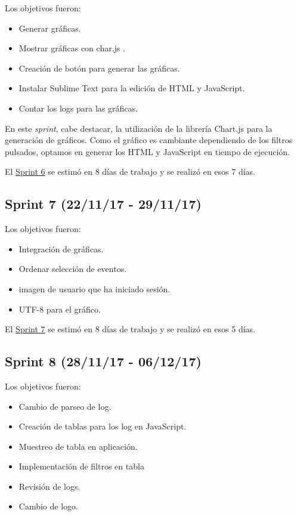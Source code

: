 Los objetivos fueron:
\begin{itemize}
	\tightlist
	\item
	Generar gráficas.
	\item
	Mostrar gráficas con char.js \cite{javascript:chart}.
	\item
	Creación de botón para generar las gráficas.	
	\item
	Instalar Sublime Text para la edición de HTML y JavaScript.
	\item
	Contar los logs para las gráficas.
	
\end{itemize}

En este \emph{sprint}, cabe destacar, la utilización de la librería Chart.js para la generación de gráficos. Como el gráfico es cambiante dependiendo de los filtros pulsados, optamos en generar los HTML y JavaScript en tiempo de ejecución.

El \href{https://github.com/trona85/GII-17.1B-UBULog-1.0/milestone/6?closed=1}{Sprint 6} se estimó en 8 días de trabajo y se realizó en esos 7 días.

\newpage
\subsection{Sprint 7 (22/11/17 -
	29/11/17)}\label{sprint-7-221117---291117}

Los objetivos fueron:
\begin{itemize}
	\tightlist
	\item
	Integración de gráficas.
	\item
	Ordenar selección de eventos.
	\item
	imagen de usuario que ha iniciado sesión.	
	\item
	UTF-8 para el gráfico.
	
\end{itemize}

El \href{https://github.com/trona85/GII-17.1B-UBULog-1.0/milestone/7?closed=1}{Sprint 7} se estimó en 8 días de trabajo y se realizó en esos 5 días.

\newpage
\subsection{Sprint 8 (28/11/17 -
	06/12/17)}\label{sprint-8-281117---061217}

Los objetivos fueron:
\begin{itemize}
	\tightlist
	\item
	Cambio de parseo de log.
	\item
	Creación de tablas para los log en JavaScript.
	\item
	Muestreo de tabla en aplicación.
	\item
	Implementación de filtros en tabla
	\item
	Revisión de logs.
	\item
	Cambio de logo.
	
\end{itemize}

